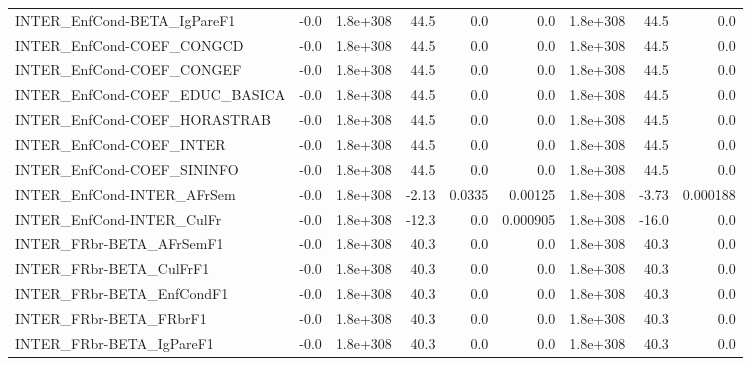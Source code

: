 \begin{tabular}{lrrrrrrrr}
INTER\_EnfCond-BETA\_IgPareF1          &        -0.0 &     1.8e+308 &    44.5 &      0.0 &        0.0 &    1.8e+308 &         44.5 &           0.0 \\
INTER\_EnfCond-COEF\_CONGCD            &        -0.0 &     1.8e+308 &    44.5 &      0.0 &        0.0 &    1.8e+308 &         44.5 &           0.0 \\
INTER\_EnfCond-COEF\_CONGEF            &        -0.0 &     1.8e+308 &    44.5 &      0.0 &        0.0 &    1.8e+308 &         44.5 &           0.0 \\
INTER\_EnfCond-COEF\_EDUC\_BASICA       &        -0.0 &     1.8e+308 &    44.5 &      0.0 &        0.0 &    1.8e+308 &         44.5 &           0.0 \\
INTER\_EnfCond-COEF\_HORASTRAB         &        -0.0 &     1.8e+308 &    44.5 &      0.0 &        0.0 &    1.8e+308 &         44.5 &           0.0 \\
INTER\_EnfCond-COEF\_INTER             &        -0.0 &     1.8e+308 &    44.5 &      0.0 &        0.0 &    1.8e+308 &         44.5 &           0.0 \\
INTER\_EnfCond-COEF\_SININFO           &        -0.0 &     1.8e+308 &    44.5 &      0.0 &        0.0 &    1.8e+308 &         44.5 &           0.0 \\
INTER\_EnfCond-INTER\_AFrSem           &        -0.0 &     1.8e+308 &   -2.13 &   0.0335 &    0.00125 &    1.8e+308 &        -3.73 &      0.000188 \\
INTER\_EnfCond-INTER\_CulFr            &        -0.0 &     1.8e+308 &   -12.3 &      0.0 &   0.000905 &    1.8e+308 &        -16.0 &           0.0 \\
INTER\_FRbr-BETA\_AFrSemF1             &        -0.0 &     1.8e+308 &    40.3 &      0.0 &        0.0 &    1.8e+308 &         40.3 &           0.0 \\
INTER\_FRbr-BETA\_CulFrF1              &        -0.0 &     1.8e+308 &    40.3 &      0.0 &        0.0 &    1.8e+308 &         40.3 &           0.0 \\
INTER\_FRbr-BETA\_EnfCondF1            &        -0.0 &     1.8e+308 &    40.3 &      0.0 &        0.0 &    1.8e+308 &         40.3 &           0.0 \\
INTER\_FRbr-BETA\_FRbrF1               &        -0.0 &     1.8e+308 &    40.3 &      0.0 &        0.0 &    1.8e+308 &         40.3 &           0.0 \\
INTER\_FRbr-BETA\_IgPareF1             &        -0.0 &     1.8e+308 &    40.3 &      0.0 &        0.0 &    1.8e+308 &         40.3 &           0.0 \\

\end{tabular}
